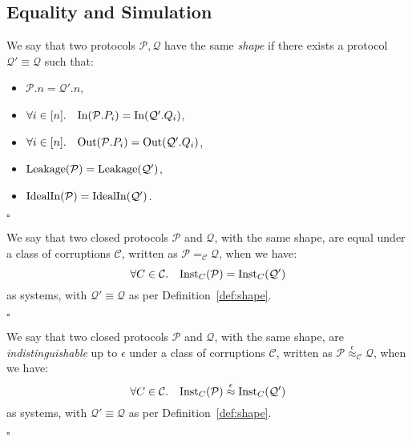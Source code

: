 \subsection{Equality and Simulation}

\begin{definition}[Shape]
  \label{def:shape}
  We say that two protocols $\mathcal{P}, \mathcal{Q}$ have the same \emph{shape}
  if there exists a protocol $\mathcal{Q}' \equiv \mathcal{Q}$ such that:
  \begin{itemize}
    \item $\mathcal{P}.n = \mathcal{Q}'.n$,
    \item $\forall i \in [n].\quad \text{In}(\mathcal{P}.P_i) = \text{In}(\mathcal{Q}'.Q_i)$,
    \item $\forall i \in [n].\quad \text{Out}(\mathcal{P}.P_i) = \text{Out}(\mathcal{Q}'.Q_i)$,
    \item $\text{Leakage}(\mathcal{P}) = \text{Leakage}(\mathcal{Q}')$,
    \item $\text{IdealIn}(\mathcal{P}) = \text{IdealIn}(\mathcal{Q}')$.
  \end{itemize}

  $\square$
\end{definition}

\begin{definition}
  We say that two closed protocols $\mathcal{P}$ and $\mathcal{Q}$,
  with the same shape,
  are equal under a class of corruptions $\mathcal{C}$,
  written as $\mathcal{P} =_{\mathcal{C}} \mathcal{Q}$, when we have:
  $$
  \forall C \in \mathcal{C}.\quad \text{Inst}_C(\mathcal{P}) = \text{Inst}_C(\mathcal{Q'})
  $$
  as systems, with $\mathcal{Q}' \equiv \mathcal{Q}$ as per 
  Definition~\ref{def:shape}.

  $\square$

\end{definition}

\begin{definition}[Indistinguishability]
  We say that two closed protocols $\mathcal{P}$ and $\mathcal{Q}$,
  with the same shape,
  are \emph{indistinguishable} up to $\epsilon$ under a class of corruptions $\mathcal{C}$,
  written as $\mathcal{P} \overset{\epsilon}{\approx}_{\mathcal{C}} \mathcal{Q}$, when we have:
  $$
  \forall C \in \mathcal{C}.\quad \text{Inst}_C(\mathcal{P}) \overset{\epsilon}{\approx} \text{Inst}_C(\mathcal{Q'})
  $$
  as systems, with $\mathcal{Q}' \equiv \mathcal{Q}$ as per 
  Definition~\ref{def:shape}.

  $\square$

\end{definition}

